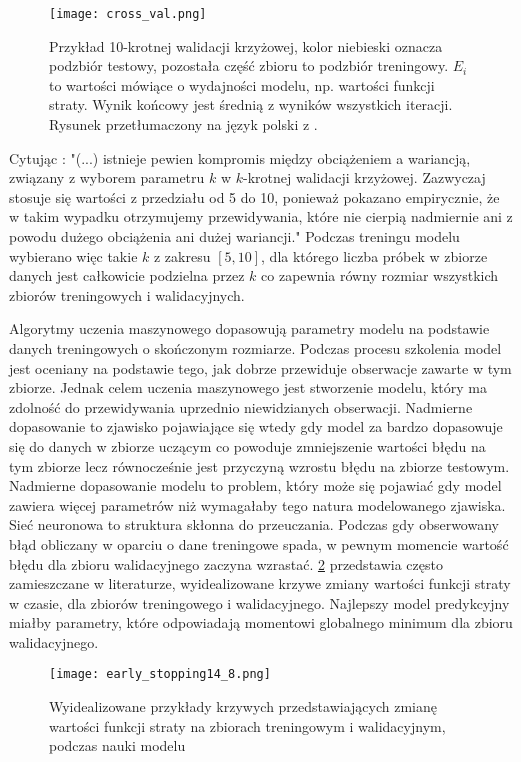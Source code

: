 \documentclass[11pt]{book}
\theoremstyle{definition}
\begin{document}
\begin{figure}[htp!]
	\centering
	\texttt{[image: cross\_val.png]}
	\caption{Przykład 10-krotnej walidacji krzyżowej, kolor niebieski oznacza podzbiór testowy, pozostała część zbioru to podzbiór treningowy. $E_i$ to wartości mówiące o wydajności modelu, np. wartości funkcji straty. Wynik końcowy jest średnią z wyników wszystkich iteracji. Rysunek przetłumaczony na język polski z \cite{Raschka:2015:PML:2886323}.}
	\label{fig:cross-val}
\end{figure}

Cytując \cite{James:2014:ISL:2517747}: "(...) istnieje pewien kompromis między obciążeniem a wariancją, związany z wyborem parametru $k$ w $k$-krotnej walidacji krzyżowej. Zazwyczaj stosuje się wartości z przedziału od 5 do 10, ponieważ pokazano empirycznie, że w takim wypadku otrzymujemy przewidywania, które nie cierpią nadmiernie ani z powodu dużego obciążenia ani dużej wariancji." Podczas treningu modelu wybierano więc takie $k$ z zakresu $[5,10]$, dla którego liczba próbek w zbiorze danych jest całkowicie podzielna przez $k$ co zapewnia równy rozmiar wszystkich zbiorów treningowych i walidacyjnych.

 
Algorytmy uczenia maszynowego dopasowują parametry modelu na podstawie danych treningowych o skończonym rozmiarze. Podczas procesu szkolenia model jest oceniany na podstawie tego, jak dobrze przewiduje obserwacje zawarte w tym zbiorze. Jednak celem uczenia maszynowego jest stworzenie modelu, który ma zdolność do przewidywania uprzednio niewidzianych obserwacji. Nadmierne dopasowanie to zjawisko pojawiające się wtedy gdy model za bardzo dopasowuje się do danych w zbiorze uczącym co powoduje zmniejszenie wartości błędu na tym zbiorze lecz równocześnie jest przyczyną wzrostu błędu na zbiorze testowym. Nadmierne dopasowanie modelu to problem, który może się pojawiać gdy model zawiera więcej parametrów niż wymagałaby tego natura modelowanego zjawiska. Sieć neuronowa to struktura skłonna do przeuczania. Podczas gdy obserwowany błąd obliczany w oparciu o dane treningowe spada, w pewnym momencie wartość błędu dla zbioru walidacyjnego zaczyna wzrastać. \figurename{} \ref{fig:loss_curves} przedstawia często zamieszczane w literaturze, wyidealizowane krzywe zmiany wartości funkcji straty w czasie, dla zbiorów treningowego i walidacyjnego. Najlepszy model predykcyjny miałby parametry, które odpowiadają momentowi globalnego minimum dla zbioru walidacyjnego.


\begin{figure}[htp!]
	\centering
	\texttt{[image: early\_stopping14\_8.png]}
	\caption{Wyidealizowane przykłady krzywych przedstawiających zmianę wartości funkcji straty na zbiorach treningowym i walidacyjnym, podczas nauki modelu}
	\label{fig:loss_curves}
\end{figure}
\end{document}

